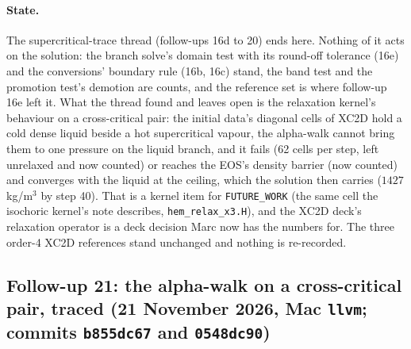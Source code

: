 \documentclass[11pt,a4paper]{article}
\newcommand{\code}[1]{\texttt{\small #1}}
\begin{document}
\paragraph{State.}  The supercritical-trace thread (follow-ups 16d to
20) ends here.  Nothing of it acts on the solution: the branch solve's
domain test with its round-off tolerance (16e) and the conversions'
boundary rule (16b, 16c) stand, the band test and the promotion test's
demotion are counts, and the reference set is where follow-up 16e left
it.  What the thread found and leaves open is the relaxation kernel's
behaviour on a cross-critical pair: the initial data's diagonal cells of
XC2D hold a cold dense liquid beside a hot supercritical vapour, the
alpha-walk cannot bring them to one pressure on the liquid branch, and
it fails (62 cells per step, left unrelaxed and now counted) or reaches
the EOS's density barrier (now counted) and converges with the liquid at
the ceiling, which the solution then carries ($1427$\,kg/m$^3$ by step
40).  That is a kernel item for \code{FUTURE\_WORK} (the same cell the
isochoric kernel's note describes, \code{hem\_relax\_x3.H}), and the
XC2D deck's relaxation operator is a deck decision Marc now has the
numbers for.  The three order-4 XC2D references stand unchanged and
nothing is re-recorded.


\subsection{Follow-up 21: the alpha-walk on a cross-critical pair, traced (21 November 2026, Mac \code{llvm}; commits \code{b855dc67} and \code{0548dc90})}
\end{document}
